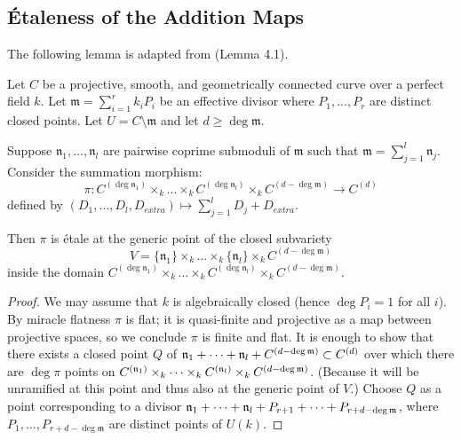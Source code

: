 \subsection{\'Etaleness of the Addition Maps}\label{subsection:etaleness_addition_maps}

The following lemma is adapted from \cite{takeuchi2019blow} (Lemma 4.1).
\begin{lemma}\label{lemma:takeuchi_lemma}
     Let $C$ be a projective, smooth, and geometrically connected curve over a perfect field $k$.
     Let $\mathfrak{m} = \sum_{i=1}^{r} k_i P_i$ be an effective divisor where $P_1, \dots, P_r$ are distinct closed points.
     Let $U = C \setminus \mathfrak{m}$ and let $d \geq \deg \mathfrak{m}$.

     Suppose $\mathfrak{n}_1, \dots, \mathfrak{n}_l$ are pairwise coprime submoduli of $\mathfrak{m}$ such that $\mathfrak{m} = \sum_{j=1}^l \mathfrak{n}_j$.
     Consider the summation morphism:
     \[
     \pi : C^{(\deg \mathfrak{n}_1)} \times_k \dots \times_k C^{(\deg \mathfrak{n}_l)} \times_k C^{(d - \deg \mathfrak{m})} \longrightarrow C^{(d)}
     \]
     defined by $(D_1, \dots, D_l, D_{extra}) \mapsto \sum_{j=1}^l D_j + D_{extra}$.

     Then $\pi$ is étale at the generic point of the closed subvariety
     \[
     V = \{\mathfrak{n}_1\} \times_k \dots \times_k \{\mathfrak{n}_l\} \times_k C^{(d - \deg \mathfrak{m})}
     \]
     inside the domain $C^{(\deg \mathfrak{n}_1)} \times_k \dots \times_k C^{(\deg \mathfrak{n}_l)} \times_k C^{(d - \deg \mathfrak{m})}$.
\end{lemma}
\begin{proof}
     We may assume that $k$ is algebraically closed (hence $\deg P_i = 1$ for all $i$). By miracle flatness $\pi$ is flat; it is quasi-finite and projective as a map between projective spaces,
     so we conclude $\pi$ is finite and flat.
     It is enough to show that there exists a closed point $Q$ of $\mathfrak{n}_1 + \dots + \mathfrak{n}_l + C^{(d - \deg \mathfrak{m})} \subset C^{(d)}$
     over which there are $\deg \pi$ points on $C^{(\mathfrak{n}_1)} \times_k \dots \times_k C^{(\mathfrak{n}_l)} \times_k C^{(d - \deg \mathfrak{m})}$. (Because it will be unramified
     at this point and thus also at the generic point of $V$.)
     Choose $Q$ as a point corresponding to a divisor
     $\mathfrak{n}_1 + \dots + \mathfrak{n}_l + P_{r+1} + \dots + P_{r+d - \deg \mathfrak{m}}$, where $P_1, \dots, P_{r+d - \deg \mathfrak{m}}$ are distinct points of $U(k)$.
\end{proof}

